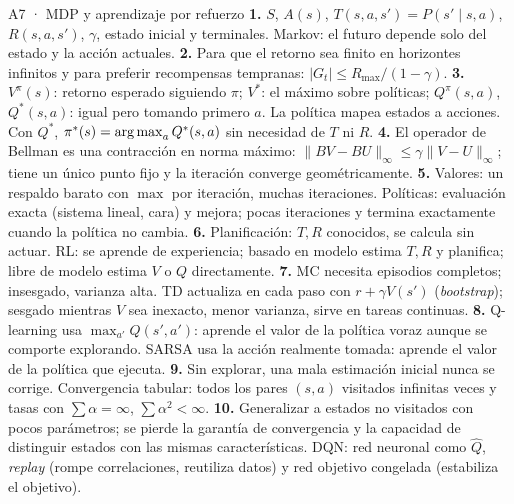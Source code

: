 \begin{solucion}{A7 · MDP y aprendizaje por refuerzo}
\textbf{1.} $S$, $A(s)$, $T(s,a,s')=P(s'\mid s,a)$, $R(s,a,s')$, $\gamma$, estado inicial y terminales. Markov: el futuro depende solo del estado y la acción actuales.
\textbf{2.} Para que el retorno sea finito en horizontes infinitos y para preferir recompensas tempranas: $|G_t|\le R_{\max}/(1-\gamma)$.
\textbf{3.} $V^\pi(s)$: retorno esperado siguiendo $\pi$; $V^*$: el máximo sobre políticas; $Q^\pi(s,a)$, $Q^*(s,a)$: igual pero tomando primero $a$.
La política mapea estados a acciones. Con $Q^*$, $\pi^*(s)=\operatorname*{arg\,max}_aQ^*(s,a)$ sin necesidad de $T$ ni $R$.
\textbf{4.} El operador de Bellman es una contracción en norma máximo: $\|BV-BU\|_\infty\le\gamma\|V-U\|_\infty$; tiene un único punto fijo y la iteración converge geométricamente.
\textbf{5.} Valores: un respaldo barato con $\max$ por iteración, muchas iteraciones. Políticas: evaluación exacta (sistema lineal, cara) y
mejora; pocas iteraciones y termina exactamente cuando la política no cambia.
\textbf{6.} Planificación: $T,R$ conocidos, se calcula sin actuar. RL: se aprende de experiencia; basado en modelo estima $T,R$ y planifica;
libre de modelo estima $V$ o $Q$ directamente.
\textbf{7.} MC necesita episodios completos; insesgado, varianza alta. TD actualiza en cada paso con $r+\gamma V(s')$ (\emph{bootstrap});
sesgado mientras $V$ sea inexacto, menor varianza, sirve en tareas continuas.
\textbf{8.} Q-learning usa $\max_{a'}Q(s',a')$: aprende el valor de la política voraz aunque se comporte explorando. SARSA usa la acción
realmente tomada: aprende el valor de la política que ejecuta.
\textbf{9.} Sin explorar, una mala estimación inicial nunca se corrige. Convergencia tabular: todos los pares $(s,a)$ visitados
infinitas veces y tasas con $\sum\alpha=\infty$, $\sum\alpha^2<\infty$.
\textbf{10.} Generalizar a estados no visitados con pocos parámetros; se pierde la garantía de convergencia y la capacidad de distinguir estados
con las mismas características. DQN: red neuronal como $\hat Q$, \emph{replay} (rompe correlaciones, reutiliza datos) y red objetivo congelada (estabiliza el objetivo).
\end{solucion}

